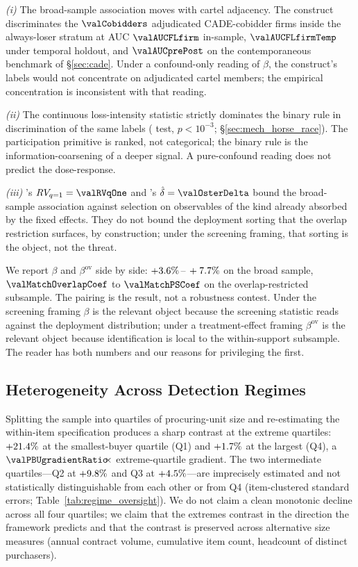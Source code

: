 \textit{(i)} The broad-sample association moves with cartel
adjacency. The construct discriminates the $\valCobidders$
adjudicated CADE-cobidder firms inside the always-loser stratum
at AUC $\valAUCFLfirm$ in-sample, $\valAUCFLfirmTemp$ under
temporal holdout, and $\valAUCprePost$ on the contemporaneous
benchmark of §\ref{sec:cade}. Under a confound-only reading of
$\beta$, the construct's labels would not concentrate on
adjudicated cartel members; the empirical concentration is
inconsistent with that reading.

\textit{(ii)} The continuous loss-intensity statistic
strictly dominates the binary rule in discrimination of the same
labels (\citealt{delong1988comparing} test, $p<10^{-3}$;
§\ref{sec:mech_horse_race}). The participation primitive is
ranked, not categorical; the binary rule is the
information-coarsening of a deeper signal. A pure-confound
reading does not predict the dose-response.

\textit{(iii)} \citet{cinelli2020making}'s
$RV_{q=1}=\valRVqOne$ and \citet{oster2019unobservable}'s
$\hat{\delta}=\valOsterDelta$ bound the broad-sample association
against selection on observables of the kind already absorbed
by the fixed effects. They do not bound the deployment
sorting that the overlap restriction surfaces, by construction;
under the screening framing, that sorting is the object, not the
threat.

We report $\beta$ and $\beta^{\text{ov}}$ side by side:
$+3.6\%\,\text{--}\,+7.7\%$ on the broad sample, $\valMatchOverlapCoef$
to $\valMatchPSCoef$ on the overlap-restricted subsample. The
pairing is the result, not a robustness contest. Under the
screening framing $\beta$ is the relevant object because the
screening statistic reads against the deployment distribution;
under a treatment-effect framing $\beta^{\text{ov}}$ is the
relevant object because identification is local to the
within-support subsample. The reader has both numbers and our
reasons for privileging the first.

\subsection{Heterogeneity Across Detection Regimes}
\label{sec:results_oversight}

Splitting the sample into quartiles of procuring-unit size and
re-estimating the within-item specification produces a sharp
contrast at the extreme quartiles: $+21.4\%$ at
the smallest-buyer quartile (Q1) and $+1.7\%$ at
the largest (Q4), a $\valPBUgradientRatio\!\!\times$
extreme-quartile gradient. The two intermediate quartiles---Q2
at $+9.8\%$ and Q3 at
$+4.5\%$---are imprecisely estimated and not
statistically distinguishable from each other or from Q4
(item-clustered standard errors;
Table~\ref{tab:regime_oversight}). We do not claim a clean
monotonic decline across all four quartiles; we claim that the
extremes contrast in the direction the framework predicts and
that the contrast is preserved across alternative size measures
(annual contract volume, cumulative item count, headcount of
distinct purchasers).

